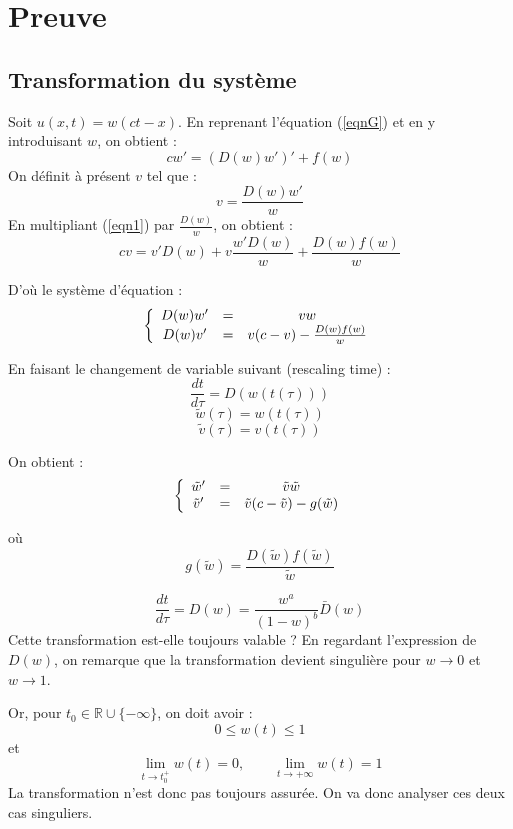 \documentclass{article}
\begin{document}
\section{Preuve}
\subsection{Transformation du système}

	Soit $u(x,t)=w(ct-x)$. En reprenant l'équation (\ref{eqnG}) et en y introduisant $w$, on obtient : \begin{equation} \label{eqn1} cw'=(D(w)w')'+f(w) \end{equation}
	On définit à présent $v$ tel que : \[v=\frac{D(w)w'}{w}\]
	En multipliant (\ref{eqn1}) par $\frac{D(w)}{w}$, on obtient : \[cv=v'D(w)+v\frac{w'D(w)}{w}+\frac{D(w)f(w)}{w}\]

D'où le système d'équation : \begin{equation} \label{eqn2} \left\{ \begin{array}{c c c}
	D(w)w' &=& vw \\
	D(w)v' &=& v(c-v)-\frac{D(w)f(w)}{w}
\end{array} \right. \end{equation}

En faisant le changement de variable suivant (rescaling time) : \[\frac{dt}{d\tau}=D(w(t(\tau)))\] \[\tilde{w}(\tau)=w(t(\tau))\] \[\tilde{v}(\tau)=v(t(\tau))\]

On obtient : 
\begin{equation} \label{eqn3} \left\{ \begin{array}{c c c}
	\tilde{w}' &=& \tilde{v}\tilde{w} \\
	\tilde{v}' &=& \tilde{v}(c-\tilde{v})-g(\tilde{w})
\end{array} \right. \end{equation}

où \[g(\tilde{w})=\frac{D(\tilde{w})f(\tilde{w})}{\tilde{w}}\]

\[\frac{dt}{d\tau}=D(w)=\frac{w^a}{(1-w)^b}\bar{D}(w)\]
Cette transformation est-elle toujours valable ? En regardant l'expression de $D(w)$, on remarque que la transformation devient singulière pour $w\to 0$ et $w\to 1$.

\bigskip
Or, pour $t_0\in \mathbb{R}\cup\{-\infty\}$, on doit avoir : \[0\leq w(t)\leq 1\] et \[\lim_{t\to t_0^+} w(t)=0, \hspace{2em} \lim_{t\to +\infty}w(t)=1\]
La transformation n'est donc pas toujours assurée. On va donc analyser ces deux cas singuliers.
\end{document}
